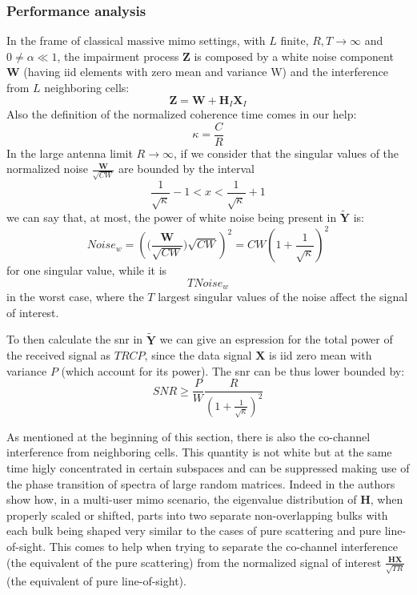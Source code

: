 \documentclass[11pt]{book}
\begin{document}
\subsubsection{Performance analysis}
In the frame of classical massive \gls{mimo} settings, with $L$ finite, $R,T \rightarrow \infty$ and $0 \neq \alpha \ll 1$, the impairment process $\mathbf{Z}$ is composed by a white noise component $\mathbf{W}$ (having iid elements with zero mean and variance W) and the interference from $L$ neighboring cells:
\begin{equation}
  \mathbf{Z} = \mathbf{W} + \mathbf{H}_I\mathbf{X}_I
\end{equation}
Also the definition of the normalized coherence time comes in our help:
\begin{equation}
  \kappa = \frac{C}{R}
\end{equation}
In the large antenna limit $R \rightarrow \infty$, if we consider that the singular values of the normalized noise $\frac{\mathbf{W}}{\sqrt{CW}}$ are bounded by the interval
\begin{equation}
  \frac{1}{\sqrt{\kappa}} - 1 < x < \frac{1}{\sqrt{\kappa}} + 1
\end{equation}
we can say that, at most, the power of white noise being present in $\mathbf{\tilde{Y}}$ is:
\begin{equation}
  Noise_w = \left(\Big(\frac{\mathbf{W}}{\sqrt{CW}}\Big)\sqrt{CW}\right)^2 = CW\left(1+\frac{1}{\sqrt{\kappa}}\right)^2
\end{equation}
for one singular value, while it is
\begin{equation}
  TNoise_w
\end{equation}
in the worst case, where the $T$ largest singular values of the noise affect the signal of interest.

To then calculate the \gls{snr} in $\mathbf{\tilde{Y}}$ we can give an espression for the total power of the received signal as $TRCP$, since the data signal $\mathbf{X}$ is iid zero mean with variance $P$ (which account for its power). The \gls{snr} can be thus lower bounded by:
\begin{equation}
  SNR \geq \frac{P}{W}\frac{R}{\left(1+ \frac{1}{\sqrt{\kappa}}\right)^2}
\end{equation}


As mentioned at the beginning of this section, there is also the co-channel interference from neighboring cells. This quantity is not white but at the same time higly concentrated in certain subspaces and can be suppressed making use of the phase transition of spectra of large random matrices. Indeed in \cite{Ralf2012} the authors show how, in a multi-user \gls{mimo} scenario, the eigenvalue distribution of $\mathbf{H}$, when properly scaled or shifted, parts into two separate non-overlapping bulks with each bulk being shaped very similar to the cases of pure scattering and pure line-of-sight. This comes to help when trying to separate the co-channel interference (the equivalent of the pure scattering) from the normalized signal of interest $\frac{\mathbf{HX}}{\sqrt{TR}}$ (the equivalent of pure line-of-sight).
\end{document}
